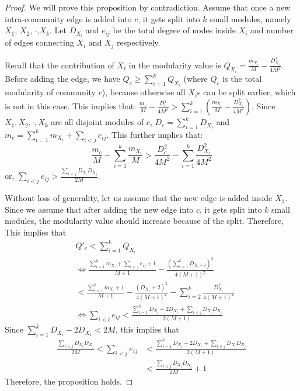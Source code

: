 \begin{proof}
We will prove this proposition by contradiction.
Assume that once a new intra-community edge is added into $c$, it gets split into $k$ small modules, namely $X_1$, $X_2$, $\cdot$,$X_k$. Let $D_{X_i}$ and $e_{ij}$ be the total degree of nodes inside $X_i$ and number of edges connecting $X_i$ and $X_j$ respectively. 


Recall that the contribution of $X_i$ in the modularity value is $Q_{X_i}=\frac{m_{X_i}}{M} - \frac{D_{X_i}^2}{4M^2}$.  
Before adding the edge, we have $Q_c \geq \sum_{i=1}^k Q_{X_i}$ (where $Q_c$ is the total modularity of community $c$), because otherwise all $X_i$s can be split earlier, which is not in this case. This implies that: $\frac{m_c}{M}- \frac{D_c^2}{4M^2} > \sum_{i=1}^k (\frac{m_{X_i}}{M} - \frac{D_{X_i}^2}{4M^2})$. Since $X_1,X_2,\cdot,X_k$ are all disjoint modules of $c$, $D_c=\sum_{i=1}^k D_{X_i}$ and $m_c=\sum_{i=1}^k m_{X_i} + \sum_{i<j} e_{ij}$. This further implies that:
\[ \frac{m_c}{M}-\sum_{i=1}^k \frac{m_{X_i}}{M} > \frac{D_c^2}{4M^2}- \sum_{i=1}^k \frac{D_{X_i}^2}{4M^2}\]
or,
$\sum_{i<j} e_{ij} > \frac{\sum_{i<j} D_{X_i}D_{X_j}}{2M}
$.
 
 Without loss of generality, let us assume that the new edge is added inside $X_1$. 
Since we assume that after adding the new edge into $c$, it gets split into $k$ small modules, the modularity value should increase because of the split. Therefore, %
This implies that
\[
\begin{split}
& Q'_c < \sum_{i=1}^k Q_{X_i}\\
& \Leftrightarrow \frac{\sum_{i=1}^k m_{X_i} + \sum_{i<j} e_{ij} + 1}{M+1} - \frac{(\sum_{i=1}^k D_{X_i +2})^2}{4(M+1)^2}\\
& < \frac{\sum_{i=1}^k m_{X_i}+1}{M+1} - \frac{(D_{X_1}+2)^2}{4(M+1)^2} - \sum_{i=2}^k \frac{D_{X_i}^2}{4(M+1)^2}\\
&\Leftrightarrow \sum_{i<i} e_{ij} < \frac{\sum_{i=1}^k D_{X_i} - 2 D_{X_1} + \sum_{i<j} D_{X_i}D_{X_j}}{2(M+1)}
\end{split}
\]
Since $\sum_{i=1}^k D_{X_i} - 2D_{X_1} < 2M$, this implies that 
\[
\begin{split}
\frac{\sum_{i<j}D_{X_i}D_{X_j}}{2M}  < \sum_{i<j}e_{ij} 
&< \frac{\sum_{i=1}^k D_{X_i} - 2D_{X_1} + \sum_{i\neq j}{D_{X_i}D_{X_j}}}{2(M+1)}\\
& <\frac{\sum_{i<j}D_{X_i}D_{X_j}}{2M}+1
\end{split}
\]
Therefore, the proposition holds.
\end{proof}









